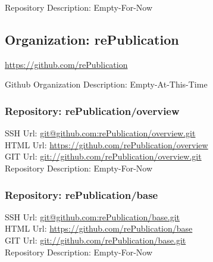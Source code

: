 Repository Description: Empty-For-Now

\subsection{Organization: rePublication}

\url{https://github.com/rePublication}

Github Organization Description: Empty-At-This-Time

\subsubsection{Repository: rePublication/overview}

SSH Url:  \url{git@github.com:rePublication/overview.git}\\
HTML Url: \url{https://github.com/rePublication/overview}\\
GIT Url:  \url{git://github.com/rePublication/overview.git}\\


Repository Description: Empty-For-Now

\subsubsection{Repository: rePublication/base}

SSH Url:  \url{git@github.com:rePublication/base.git}\\
HTML Url: \url{https://github.com/rePublication/base}\\
GIT Url:  \url{git://github.com/rePublication/base.git}\\


Repository Description: Empty-For-Now

